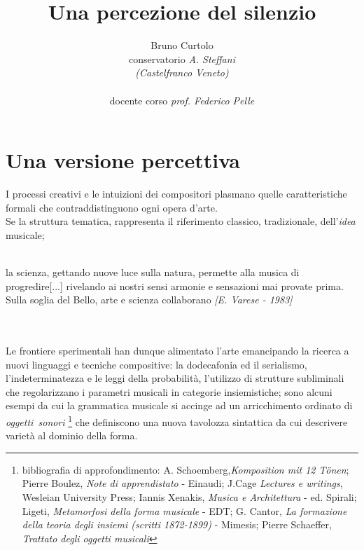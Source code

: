 \documentclass[a4paper,12pt]{article}
\title{Una percezione del silenzio}
\author{Bruno Curtolo \\
conservatorio \textit{A. Steffani} \\
\emph{(Castelfranco Veneto)}\\
\\
docente corso \textit{prof. Federico Pelle}}
\begin{document}
\maketitle

\newpage
\section*{Una versione percettiva}
I processi creativi e le intuizioni dei compositori plasmano quelle caratteristiche formali che contraddistinguono ogni opera d'arte.\\
Se la struttura tematica, rappresenta il riferimento classico, tradizionale, dell'\textit{idea} musicale\cite{rif1};
\\
\begin{small}\\
la scienza, gettando nuove luce sulla natura, permette alla musica di progredire[...] rivelando ai nostri sensi armonie e sensazioni mai provate prima. Sulla soglia del Bello, arte e scienza collaborano \textit{[E. Varese - 1983]\cite{rif2}}
\end{small}
\\
\\
Le frontiere sperimentali han dunque alimentato l'arte emancipando la ricerca a nuovi linguaggi e tecniche compositive: la \mbox{dodecafonia} ed il \mbox{serialismo},
\mbox{l'indeterminatezza} e
le leggi della \mbox{probabilità},
l'utilizzo di strutture subliminali che regolarizzano i parametri musicali in categorie \mbox{insiemistiche};
sono alcuni esempi da cui la grammatica musicale si accinge ad un arricchimento ordinato di \textit{\mbox{oggetti sonori}}
\footnote{bibliografia di approfondimento: A. Schoemberg,\emph{Komposition mit 12 Tönen}; Pierre Boulez, \emph{Note di apprendistato} - Einaudi; J.Cage \emph{Lectures e writings}, Wesleian University Press; Iannis Xenakis, \emph{Musica e Architettura} - ed. Spirali; Ligeti, \emph{Metamorfosi della forma musicale} - EDT; G. Cantor, \emph{La formazione della teoria degli insiemi (scritti 1872-1899)} - Mimesis; Pierre Schaeffer, \emph{Trattato degli oggetti musicali}}
che definiscono una nuova tavolozza sintattica da cui descrivere varietà al dominio della forma.
\end{document}
